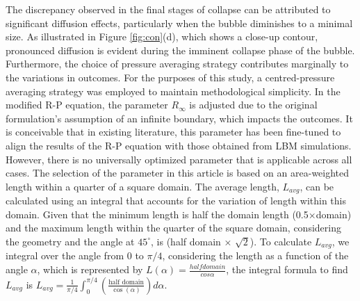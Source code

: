 \documentclass[review]{elsarticle}
\begin{document}
The discrepancy observed in the final stages of collapse can be attributed to significant diffusion effects, particularly when the bubble diminishes to a minimal size. As illustrated in Figure \ref{fig:con}(d), which shows a close-up contour, pronounced diffusion is evident during the imminent collapse phase of the bubble. Furthermore, the choice of pressure averaging strategy contributes marginally to the variations in outcomes. For the purposes of this study, a centred-pressure averaging strategy was employed to maintain methodological simplicity. In the modified R-P equation, the parameter $R_{\infty}$ is adjusted due to the original formulation's assumption of an infinite boundary, which impacts the outcomes. It is conceivable that in existing literature, this parameter has been fine-tuned to align the results of the R-P equation with those obtained from LBM simulations. However, there is no universally optimized parameter that is applicable across all cases. The selection of the parameter in this article is based on an area-weighted length within a quarter of a square domain. The average length, $L_{avg}$, can be calculated using an integral that accounts for the variation of length within this domain. Given that the minimum length is half the domain length (0.5×domain) and the maximum length within the quarter of the square domain, considering the geometry and the angle at $45^\circ$, is (half domain × $\sqrt{2}$). To calculate $L_{avg}$, we integral over the angle from 0 to $\pi/4$, considering the length as a function of the angle $\alpha$, which is represented by $L(\alpha)=\frac{half domain}{cos\alpha}$, the integral formula to find
$L_{avg}$ is $L_{avg} = \frac{1}{\pi/4} \int_{0}^{\pi/4} \left( \frac{\text{half domain}}{\cos(\alpha)} \right) d\alpha$.
\end{document}
